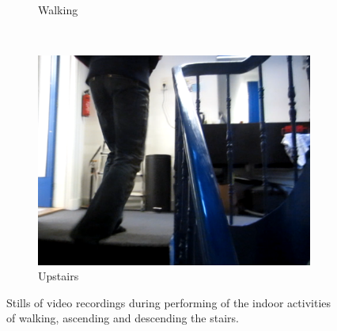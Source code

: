 \begin{figure}
\begin{subfigure}[b]{0.3\textwidth}
    \caption{Walking}
    \label{fig:stills_subject_3_walking}
  \end{subfigure}
  ~
  \begin{subfigure}[b]{0.3\textwidth}
    \includegraphics[width=\textwidth]{./Figures/chapter6/data_collection/stills/marc_stairs_up_walk.png}
    \caption{Upstairs}
    \label{fig:stills_subject_3_upstairs}
  \end{subfigure}
  \caption[Stills subject 3]{Stills of video recordings during performing of the indoor activities of walking, ascending and descending the stairs.}\label{fig:stills_subject_3}
\end{figure}


